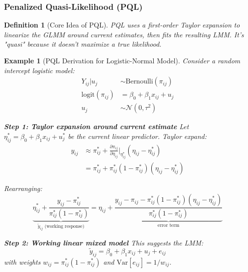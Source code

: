 \documentclass{article}
\newtheorem{definition}{Definition}
\newtheorem{example}{Example}
\begin{document}
\subsubsection{Penalized Quasi-Likelihood (PQL)}

\begin{definition}[Core Idea of PQL]
PQL uses a first-order Taylor expansion to linearize the GLMM around current estimates, then fits the resulting LMM. It's "quasi" because it doesn't maximize a true likelihood.
\end{definition}

\begin{example}[PQL Derivation for Logistic-Normal Model]
Consider a random intercept logistic model:
\begin{align}
Y_{ij}|u_j &\sim \text{Bernoulli}(\pi_{ij}) \\
\text{logit}(\pi_{ij}) &= \beta_0 + \beta_1 x_{ij} + u_j \\
u_j &\sim \mathcal{N}(0, \tau^2)
\end{align}

\textbf{Step 1: Taylor expansion around current estimate}
Let $\eta_{ij}^* = \beta_0 + \beta_1 x_{ij} + u_j^*$ be the current linear predictor. Taylor expand:
\begin{align}
y_{ij} &\approx \pi_{ij}^* + \frac{\partial \pi_{ij}}{\partial \eta_{ij}}\bigg|_{\eta_{ij}^*} (\eta_{ij} - \eta_{ij}^*) \\
&= \pi_{ij}^* + \pi_{ij}^*(1-\pi_{ij}^*)(\eta_{ij} - \eta_{ij}^*)
\end{align}

Rearranging:
\begin{equation}
\underbrace{\eta_{ij}^* + \frac{y_{ij} - \pi_{ij}^*}{\pi_{ij}^*(1-\pi_{ij}^*)}}_{\tilde{y}_{ij} \text{ (working response)}} = \eta_{ij} + \underbrace{\frac{y_{ij} - \pi_{ij} - \pi_{ij}^*(1-\pi_{ij}^*)(\eta_{ij} - \eta_{ij}^*)}{\pi_{ij}^*(1-\pi_{ij}^*)}}_{\text{error term}}
\end{equation}

\textbf{Step 2: Working linear mixed model}
This suggests the LMM:
\begin{equation}
\tilde{y}_{ij} = \beta_0 + \beta_1 x_{ij} + u_j + e_{ij}
\end{equation}
with weights $w_{ij} = \pi_{ij}^*(1-\pi_{ij}^*)$ and $\text{Var}[e_{ij}] = 1/w_{ij}$.
\end{example}
\end{document}
